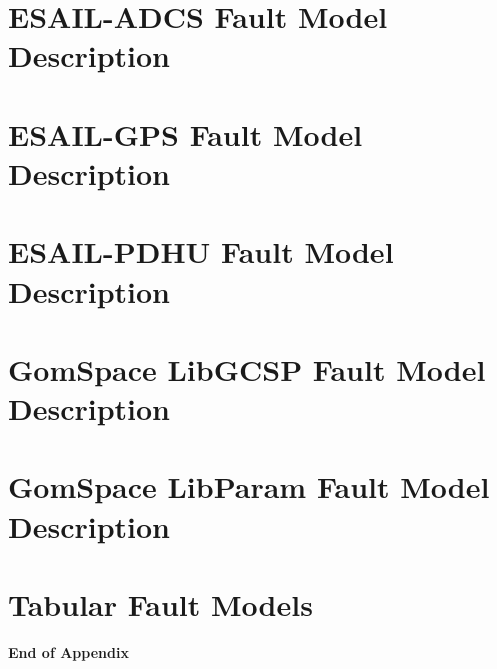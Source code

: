 \documentclass[11pt,twoside]{book}
\begin{document}
\clearpage

\section{ESAIL-ADCS Fault Model Description}



\section{ESAIL-GPS Fault Model Description}



\section{ESAIL-PDHU Fault Model Description}



\section{GomSpace LibGCSP Fault Model Description}



\section{GomSpace LibParam Fault Model Description}



\section{Tabular Fault Models}



\textbf{End of Appendix}

   
\clearpage

\clearpage

\printindex



\end{document}
